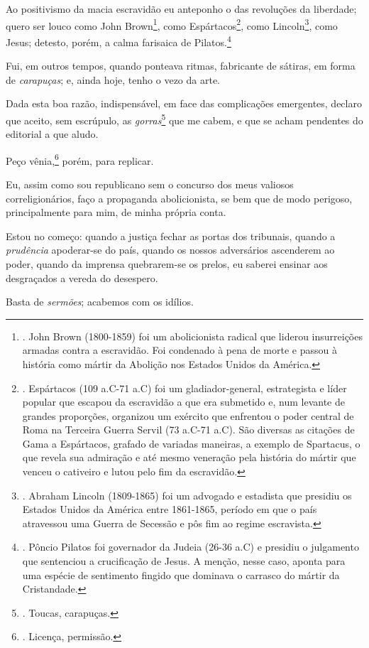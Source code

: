 Ao positivismo da macia escravidão eu anteponho o das revoluções da
liberdade; quero ser louco como John Brown\footnote{. John Brown
  (1800-1859) foi um abolicionista radical que liderou insurreições
  armadas contra a escravidão. Foi condenado à pena de morte e passou à
  história como mártir da Abolição nos Estados Unidos da América.}, como
Espártacos\footnote{. Espártacos (109 a.C-71 a.C) foi um
  gladiador-general, estrategista e líder popular que escapou da
  escravidão a que era submetido e, num levante de grandes proporções,
  organizou um exército que enfrentou o poder central de Roma na
  Terceira Guerra Servil (73 a.C-71 a.C). São diversas as citações de
  Gama a Espártacos, grafado de variadas maneiras, a exemplo de
  Spartacus, o que revela sua admiração e até mesmo veneração pela
  história do mártir que venceu o cativeiro e lutou pelo fim da
  escravidão.}, como Lincoln\footnote{. Abraham Lincoln (1809-1865) foi
  um advogado e estadista que presidiu os Estados Unidos da América
  entre 1861-1865, período em que o país atravessou uma Guerra de
  Secessão e pôs fim ao regime escravista.}, como Jesus; detesto, porém,
a calma farisaica de Pilatos.\footnote{. Pôncio Pilatos foi governador
  da Judeia (26-36 a.C) e presidiu o julgamento que sentenciou a
  crucificação de Jesus. A menção, nesse caso, aponta para uma espécie
  de sentimento fingido que dominava o carrasco do mártir da
  Cristandade.}

Fui, em outros tempos, quando ponteava ritmas, fabricante de sátiras, em
forma de \emph{carapuças}; e, ainda hoje, tenho o vezo da arte.

Dada esta boa razão, indispensável, em face das complicações emergentes,
declaro que aceito, sem escrúpulo, as \emph{gorras}\footnote{. Toucas,
  carapuças.} que me cabem, e que se acham pendentes do editorial a que
aludo.

Peço vênia,\footnote{. Licença, permissão.}
porém, para replicar.

Eu, assim como sou republicano sem o concurso dos meus valiosos
correligionários, faço a propaganda abolicionista, se bem que de modo
perigoso, principalmente para mim, de minha própria conta.

Estou no começo: quando a justiça fechar as portas dos tribunais, quando
a \emph{prudência} apoderar-se do país, quando os nossos adversários
ascenderem ao poder, quando da imprensa quebrarem-se os prelos, eu
saberei ensinar aos desgraçados a vereda do desespero.

Basta de \emph{sermões}; acabemos com os idílios.

